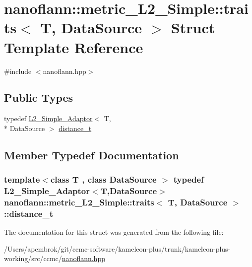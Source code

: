\hypertarget{structnanoflann_1_1metric___l2___simple_1_1traits}{\section{nanoflann\-:\-:metric\-\_\-\-L2\-\_\-\-Simple\-:\-:traits$<$ T, Data\-Source $>$ Struct Template Reference}
\label{structnanoflann_1_1metric___l2___simple_1_1traits}
}


{\ttfamily \#include $<$nanoflann.\-hpp$>$}

\subsection*{Public Types}
\begin{DoxyCompactItemize}
\item 
typedef \hyperlink{structnanoflann_1_1_l2___simple___adaptor}{L2\-\_\-\-Simple\-\_\-\-Adaptor}$<$ T, \\*
Data\-Source $>$ \hyperlink{structnanoflann_1_1metric___l2___simple_1_1traits_aae46920bee1091763a689b896d3b05c9}{distance\-\_\-t}
\end{DoxyCompactItemize}


\subsection{Member Typedef Documentation}
\hypertarget{structnanoflann_1_1metric___l2___simple_1_1traits_aae46920bee1091763a689b896d3b05c9}{
\subsubsection[{distance\-\_\-t}]{\setlength{\rightskip}{0pt plus 5cm}template$<$class T , class Data\-Source $>$ typedef {\bf L2\-\_\-\-Simple\-\_\-\-Adaptor}$<$T,Data\-Source$>$ {\bf nanoflann\-::metric\-\_\-\-L2\-\_\-\-Simple\-::traits}$<$ T, Data\-Source $>$\-::{\bf distance\-\_\-t}}}\label{structnanoflann_1_1metric___l2___simple_1_1traits_aae46920bee1091763a689b896d3b05c9}


The documentation for this struct was generated from the following file\-:\begin{DoxyCompactItemize}
\item 
/\-Users/apembrok/git/ccmc-\/software/kameleon-\/plus/trunk/kameleon-\/plus-\/working/src/ccmc/\hyperlink{nanoflann_8hpp}{nanoflann.\-hpp}\end{DoxyCompactItemize}
